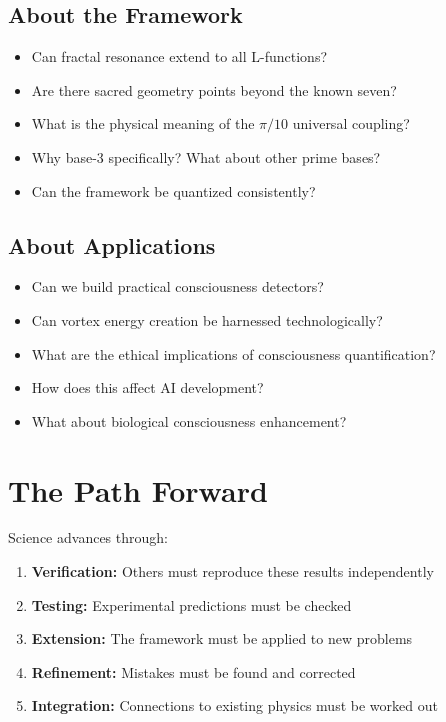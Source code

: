 \subsection*{About the Framework}

\begin{itemize}
\item Can fractal resonance extend to all L-functions?
\item Are there sacred geometry points beyond the known seven?
\item What is the physical meaning of the $\pi/10$ universal coupling?
\item Why base-3 specifically? What about other prime bases?
\item Can the framework be quantized consistently?
\end{itemize}

\subsection*{About Applications}

\begin{itemize}
\item Can we build practical consciousness detectors?
\item Can vortex energy creation be harnessed technologically?
\item What are the ethical implications of consciousness quantification?
\item How does this affect AI development?
\item What about biological consciousness enhancement?
\end{itemize}

\section*{The Path Forward}

Science advances through:
\begin{enumerate}
\item \textbf{Verification:} Others must reproduce these results independently
\item \textbf{Testing:} Experimental predictions must be checked
\item \textbf{Extension:} The framework must be applied to new problems
\item \textbf{Refinement:} Mistakes must be found and corrected
\item \textbf{Integration:} Connections to existing physics must be worked out
\end{enumerate}

